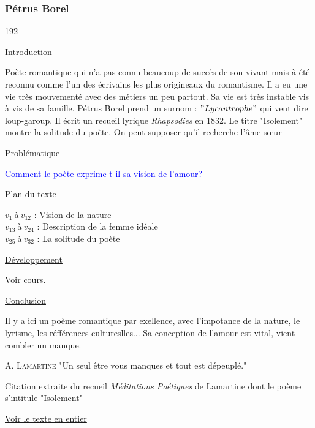 \documentclass[12pt,a4paper]{article}
\begin{document}
			\subsubsection{\href{Bio/Borel.pdf}{P\'etrus Borel}}
\begin{dingautolist}{192}

\item \underline{Introduction} \par
		Po\`ete romantique qui n'a pas connu beaucoup de succ\`es de son vivant mais \`a \'et\'e reconnu comme l'un des \'ecrivains les plus origineaux du romantisme. 
		Il a eu une vie tr\`es mouvement\'e avec des m\'etiers un peu partout. Sa vie est tr\`es instable vis \`a vis de sa famille. P\'etrus Borel prend un surnom : $"Lycantrophe"$ qui veut dire loup-garoup. 
		Il \'ecrit un recueil lyrique \textit{Rhapsodies} en 1832. Le titre "Isolement" montre la solitude du po\`ete. On peut supposer qu'il recherche l'\^ame s\oe ur

\item \underline{Probl\'ematique }\par
		\textcolor{blue}{Comment le po\`ete exprime-t-il sa vision de l'amour?}

\item \underline{Plan du texte} \par
		$v_{1}~$\`a$~v_{12}$ : Vision de la nature\\
		$v_{13}~$\`a$~v_{24}$ : Description de la femme id\'eale\\
		$v_{25}~$\`a$~v_{32}$ : La solitude du po\`ete

\item \underline{D\'eveloppement} \par
		Voir cours.

\item \underline{Conclusion} \par
		Il y a ici un po\`eme romantique par exellence, avec l'impotance de la nature, le lyrisme, les r\'eff\'erences cultureslles... Sa conception de l'amour est vital, vient combler un manque.\par 
		A. \textsc{Lamartine}
		"Un seul \^etre vous manques et tout est d\'epeupl\'e."
		
		Citation extraite du recueil \textit{M\'editations Po\'etiques} de Lamartine dont le po\`eme s'intitule "Isolement"  		



\end{dingautolist}		
\href{Textes/Isolement.pdf}{Voir le texte en entier}
 \newpage
\end{document}
